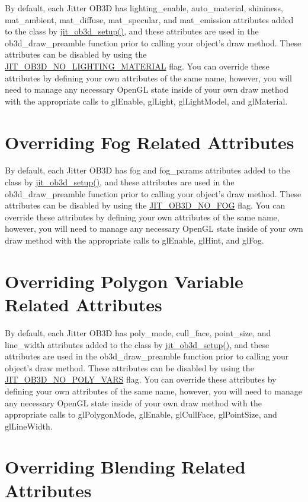 By default, each Jitter OB3D has lighting\_\-enable, auto\_\-material, shininess, mat\_\-ambient, mat\_\-diffuse, mat\_\-specular, and mat\_\-emission attributes added to the class by \hyperlink{group__ob3dmod_gaee60152a1d507a630e14f0e4f71e86f2}{jit\_\-ob3d\_\-setup()}, and these attributes are used in the ob3d\_\-draw\_\-preamble function prior to calling your object's draw method. These attributes can be disabled by using the \hyperlink{group__jitter_gaf7b319953ace69f17633be98233fd324}{JIT\_\-OB3D\_\-NO\_\-LIGHTING\_\-MATERIAL} flag. You can override these attributes by defining your own attributes of the same name, however, you will need to manage any necessary OpenGL state inside of your own draw method with the appropriate calls to glEnable, glLight, glLightModel, and glMaterial.\hypertarget{chapter_jit_ob3ddetails_chapter_jit_ob3ddetails_fog}{}\section{Overriding Fog Related Attributes}\label{chapter_jit_ob3ddetails_chapter_jit_ob3ddetails_fog}
By default, each Jitter OB3D has fog and fog\_\-params attributes added to the class by \hyperlink{group__ob3dmod_gaee60152a1d507a630e14f0e4f71e86f2}{jit\_\-ob3d\_\-setup()}, and these attributes are used in the ob3d\_\-draw\_\-preamble function prior to calling your object's draw method. These attributes can be disabled by using the \hyperlink{group__jitter_gaf9c39790969f477fb42c3fe674eb5ca7}{JIT\_\-OB3D\_\-NO\_\-FOG} flag. You can override these attributes by defining your own attributes of the same name, however, you will need to manage any necessary OpenGL state inside of your own draw method with the appropriate calls to glEnable, glHint, and glFog.\hypertarget{chapter_jit_ob3ddetails_chapter_jit_ob3ddetails_poly}{}\section{Overriding Polygon Variable Related Attributes}\label{chapter_jit_ob3ddetails_chapter_jit_ob3ddetails_poly}
By default, each Jitter OB3D has poly\_\-mode, cull\_\-face, point\_\-size, and line\_\-width attributes added to the class by \hyperlink{group__ob3dmod_gaee60152a1d507a630e14f0e4f71e86f2}{jit\_\-ob3d\_\-setup()}, and these attributes are used in the ob3d\_\-draw\_\-preamble function prior to calling your object's draw method. These attributes can be disabled by using the \hyperlink{group__jitter_ga2eee6fc87f33ea672c921cddf960d5e1}{JIT\_\-OB3D\_\-NO\_\-POLY\_\-VARS} flag. You can override these attributes by defining your own attributes of the same name, however, you will need to manage any necessary OpenGL state inside of your own draw method with the appropriate calls to glPolygonMode, glEnable, glCullFace, glPointSize, and glLineWidth.\hypertarget{chapter_jit_ob3ddetails_chapter_jit_ob3ddetails_blend}{}\section{Overriding Blending Related Attributes}\label{chapter_jit_ob3ddetails_chapter_jit_ob3ddetails_blend}
